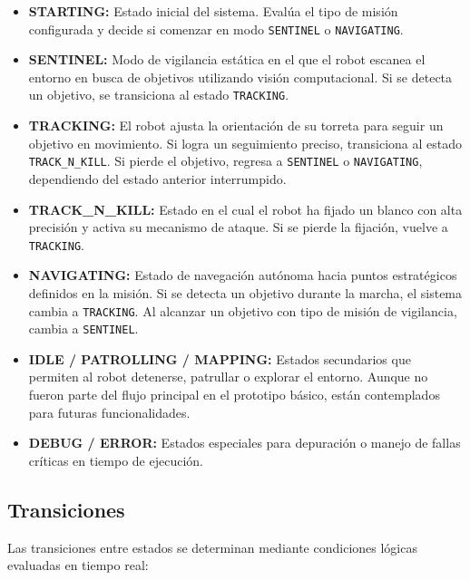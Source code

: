 \begin{itemize}
    \item \textbf{STARTING:} Estado inicial del sistema. Evalúa el tipo de misión configurada y decide si comenzar en modo \texttt{SENTINEL} o \texttt{NAVIGATING}.

    \item \textbf{SENTINEL:} Modo de vigilancia estática en el que el robot escanea el entorno en busca de objetivos utilizando visión computacional. Si se detecta un objetivo, se transiciona al estado \texttt{TRACKING}.

    \item \textbf{TRACKING:} El robot ajusta la orientación de su torreta para seguir un objetivo en movimiento. Si logra un seguimiento preciso, transiciona al estado \texttt{TRACK\_N\_KILL}. Si pierde el objetivo, regresa a \texttt{SENTINEL} o \texttt{NAVIGATING}, dependiendo del estado anterior interrumpido.

    \item \textbf{TRACK\_N\_KILL:} Estado en el cual el robot ha fijado un blanco con alta precisión y activa su mecanismo de ataque. Si se pierde la fijación, vuelve a \texttt{TRACKING}.

    \item \textbf{NAVIGATING:} Estado de navegación autónoma hacia puntos estratégicos definidos en la misión. Si se detecta un objetivo durante la marcha, el sistema cambia a \texttt{TRACKING}. Al alcanzar un objetivo con tipo de misión de vigilancia, cambia a \texttt{SENTINEL}.

    \item \textbf{IDLE / PATROLLING / MAPPING:} Estados secundarios que permiten al robot detenerse, patrullar o explorar el entorno. Aunque no fueron parte del flujo principal en el prototipo básico, están contemplados para futuras funcionalidades.

    \item \textbf{DEBUG / ERROR:} Estados especiales para depuración o manejo de fallas críticas en tiempo de ejecución.
\end{itemize}

\subsection*{Transiciones}

Las transiciones entre estados se determinan mediante condiciones lógicas evaluadas en tiempo real:


